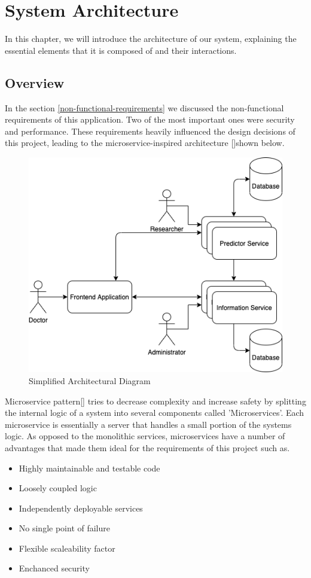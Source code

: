 \chapter{System Architecture}
	\label{architecture}
	In this chapter, we will introduce the architecture of our system, explaining the essential elements that it is 
	composed of and their interactions.
	\section{Overview}
		In the section \ref{non-functional-requirements} we discussed the non-functional requirements of this application. Two 
		of the most important ones were security and performance. These requirements heavily influenced the design decisions 
		of this project, leading to the microservice-inspired architecture [\cite{newman_2020}]shown below.
		\begin{figure}[H]
			\iftrue
			\caption{Simplified Architectural Diagram}
			\centering
			\includegraphics[scale=0.5]{figures/system-architecture}
			\fi
		\end{figure}
		Microservice pattern[\cite{newman_2020}] tries to decrease complexity and increase safety by splitting the internal logic 
		of a system into several components called 'Microservices'. Each microservice is essentially a server that handles a small 
		portion of the systems logic. As opposed to the  monolithic services, microservices have a number of advantages that made 
		them ideal for the requirements of this project such as.
		\begin{itemize}
			\item Highly maintainable and testable code
			\item Loosely coupled logic
			\item Independently deployable services
			\item No single point of failure
			\item Flexible scaleability factor
			\item Enchanced security
		\end{itemize}
